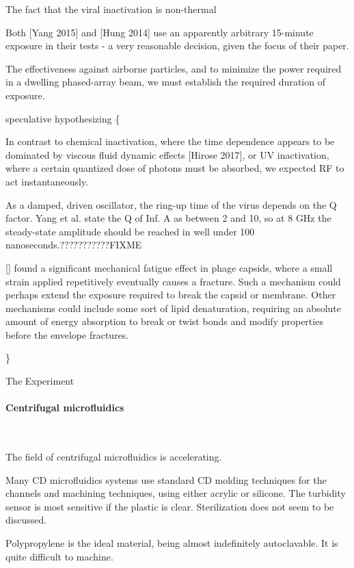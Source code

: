 \documentclass[fleqn,10pt]{article}
\begin{document}
The fact that the viral inactivation is non-thermal

Both [Yang 2015] and [Hung 2014] use an apparently arbitrary 15-minute exposure in their tests - a very reasonable decision, given the focus of their paper. 

The effectiveness against airborne particles, and to minimize the power required in a dwelling phased-array beam, we must establish the required duration of exposure.

{\color{red} speculative hypothesizing \{ } 

In contrast to chemical inactivation, where the time dependence appears to be dominated by viscous fluid dynamic effects [Hirose 2017], or UV inactivation, where a certain quantized dose of photons must be absorbed, we expected RF to act instantaneously.

As a damped, driven oscillator, the ring-up time of the virus depends on the Q factor. Yang et al. state the Q of Inf. A as between 2 and 10, so at 8 GHz the steady-state amplitude should be reached in well under 100 nanoseconds.???????????FIXME

[] found a significant mechanical fatigue effect in phage capsids, where a small strain applied repetitively eventually causes a fracture. Such a mechanism could perhaps extend the exposure required to break the capsid or membrane. Other mechanisms could include some sort of lipid denaturation, requiring an absolute amount of energy absorption to break or twist bonds and modify properties before the envelope fractures.


{\color{red}  \} } 















\clearpage
\begin{multicols}{1}
{\Large The Experiment}\\

\paragraph{\textbf{Centrifugal microfluidics}}\

The field of centrifugal microfluidics is accelerating. 

Many CD microfluidics systems use standard CD molding techniques for the channels and machining techniques, using either acrylic or silicone. The turbidity sensor is most sensitive if the plastic is clear. Sterilization does not seem to be discussed. 

Polypropylene is the ideal material, being almost indefinitely autoclavable. It is quite difficult to machine.

\end{multicols}
\end{document}
